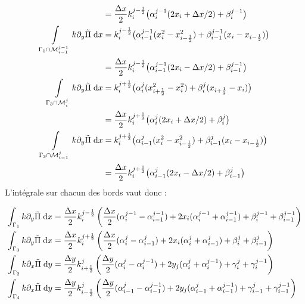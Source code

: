 \documentclass[main.tex]{subfiles}
\begin{document}
\begin{align}
 & = \frac{\Delta x}{2} k_i^{j-\frac{1}{2}} \big( \alpha_i^{j-1} (  2x_i + \Delta x /2 ) + \beta_i^{j-1} \big)
\\
\int\limits_{\Gamma_1 \cap \mathcal{M}_{i-1}^{j-1}} k \partial_y \tilde{\Pi} \;{\rm d}x  & =  k_i^{j-\frac{1}{2}} \big( \alpha_{i-1}^{j-1} (  x^2_i - x^2_{i-\frac{1}{2}}) + \beta_{i-1}^{j-1} ( x_i - x_{i-\frac{1}{2}} )\big)  \nonumber \\
& = \frac{\Delta x}{2} k_i^{j-\frac{1}{2}} \big( \alpha_{i-1}^{j-1} (2 x_i - \Delta x /2 ) + \beta_{i-1}^{j-1} \big) 
\\
\int\limits_{\Gamma_3 \cap \mathcal{M}_i^j} k \partial_y \tilde{\Pi} \;{\rm d}x  & =  k_i^{j+\frac{1}{2}} \big( \alpha_i^j ( x^2_{i+\frac{1}{2}} - x^2_i) + \beta_i^j ( x_{i+\frac{1}{2}} - x_i)\big)  \nonumber \\
 & = \frac{\Delta x}{2} k_i^{j+\frac{1}{2}} \big( \alpha_i^j ( 2x_i + \Delta x /2) + \beta_i^j \big)  
\\
\int\limits_{\Gamma_3 \cap \mathcal{M}_{i-1}^j} k \partial_y \tilde{\Pi} \;{\rm d}x  & =  k_i^{j+\frac{1}{2}} \big( \alpha_{i-1}^j (  x^2_i - x^2_{i-\frac{1}{2}}) + \beta_{i-1}^j ( x_i - x_{i-\frac{1}{2}} )\big)  \nonumber \\
 & = \frac{\Delta x}{2}  k_i^{j+\frac{1}{2}} \big( \alpha_{i-1}^j (  2x_i - \Delta x /2) + \beta_{i-1}^j \big)
\end{align}
L'intégrale sur chacun des bords vaut donc :

\begin{align}
\int_{\Gamma_1} k \partial_y \tilde{\Pi} \;{\rm d}x & = \frac{\Delta x}{2} k_i^{j-\frac{1}{2}} \left( \frac{\Delta x}{2} (\alpha_i^{j-1}-\alpha_{i-1}^{j-1}) + 2x_i (\alpha_i^{j-1}+\alpha_{i-1}^{j-1}) + \beta_i^{j-1} + \beta_{i-1}^{j-1} \right) \label{eq:bord1}\\
\int_{\Gamma_3} k \partial_y \tilde{\Pi} \;{\rm d}x & = \frac{\Delta x}{2} k_i^{j+\frac{1}{2}} \left( \frac{\Delta x}{2} (\alpha_i^j-\alpha_{i-1}^j) + 2x_i (\alpha_i^j+\alpha_{i-1}^j) + \beta_i^j + \beta_{i-1}^j \right) \label{eq:bord2}\\
\int_{\Gamma_2} k \partial_x \tilde{\Pi} \;{\rm d}y & = \frac{\Delta y}{2} k_{i+\frac{1}{2}}^j  \left(\frac{\Delta y}{2} (\alpha_i^j - \alpha_i^{j-1}) +  2y_j (\alpha_i^j + \alpha_i^{j-1}) + \gamma_i^j + \gamma_i^{j-1} \right) \label{eq:bord3} \\
\int_{\Gamma_4} k \partial_x \tilde{\Pi} \;{\rm d}y & = \frac{\Delta y}{2} k_{i-\frac{1}{2}}^j  \left( \frac{\Delta y}{2} (\alpha_{i-1}^j-\alpha_{i-1}^{j-1}) + 2y_j(\alpha_{i-1}^j+\alpha_{i-1}^{j-1}) + \gamma_{i-1}^j + \gamma_{i-1}^{j-1} \right) \label{eq:bord4}
\end{align}
\end{document}
